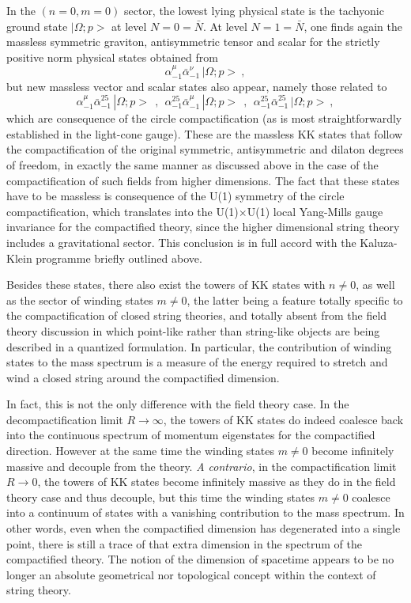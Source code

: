 \documentclass[a4paper,11pt]{article}
\begin{document}
In the $(n=0,m=0)$ sector, the lowest lying physical state is
the ta\-chyo\-nic ground state $|\Omega;p>$ at level $N=0=\bar{N}$.
At level $N=1=\bar{N}$, one finds again the massless symmetric graviton,
antisymmetric tensor and scalar for the strictly positive norm
physical states obtained from
\begin{equation}
\alpha^\mu_{-1}\bar{\alpha}^\nu_{-1}\,|\Omega;p>\ ,
\end{equation}
but new massless vector and scalar states also appear, namely those
related to
\begin{equation}
\alpha^\mu_{-1}\bar{\alpha}^{25}_{-1}\,|\Omega;p>\ \ ,\ \ 
\alpha^{25}_{-1}\bar{\alpha}^\mu_{-1}\,|\Omega;p>\ \ ,\ \ 
\alpha^{25}_{-1}\bar{\alpha}^{25}_{-1}\,|\Omega;p>\ ,
\end{equation}
which are consequence of the circle compactification
(as is most straightforwardly established in the light-cone gauge).
These are the massless KK states that follow the compactification
of the original symmetric, antisymmetric and dilaton degrees of freedom, in 
exactly the same manner as discussed above in the case of the compactification
of such fields from higher dimensions. The fact that these states have to 
be massless is consequence of the U(1) symmetry of the circle
compactification, which translates into the U(1)$\times$U(1) local Yang-Mills
gauge invariance for the compactified theory, since the higher dimensional
string theory includes a gravitational sector. This conclusion is in full
accord with the Kaluza-Klein programme briefly outlined above.

Besides these states, there also exist the towers of KK states with $n\ne 0$,
as well as the sector of winding states $m\ne 0$, the latter being a feature
totally specific to the compactification of closed string theories, and
totally absent from the field theory discussion in which point-like rather
than string-like objects are being described in a quantized formulation.
In particular, the contribution of winding states to the mass spectrum
is a measure of the energy required to stretch and wind a closed string
around the compactified dimension.

In fact, this is not the only difference with the field theory case.
In the decompactification limit $R\rightarrow\infty$, the towers
of KK states do indeed coalesce back into the continuous spectrum of
momentum eigenstates for the com\-pac\-ti\-fied direction. However at the same
time the winding states $m\ne 0$ become infinitely massive and decouple
from the theory. {\sl A contrario\/}, in the com\-pac\-ti\-fi\-ca\-tion limit
$R\rightarrow 0$, the towers of KK states become infinitely massive as
they do in the field theory case and thus decouple, but this time the
winding states $m\ne 0$ coalesce into a continuum of states with a vanishing
contribution to the mass spectrum. In other words, even when the compactified
dimension has degenerated into a single point, there is still a trace of
that extra dimension in the spectrum of the compactified theory. The notion
of the dimension of spacetime appears to be no longer an absolute geometrical 
nor topological concept within the context of string theory.
\end{document}
